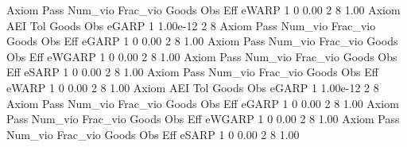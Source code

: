        Axiom {\VBAR} Pass     Num_vio    Frac_vio       Goods         Obs         Eff  
       eWARP {\VBAR}    1           0        0.00           2           8        1.00  
{\smallskip}
       Axiom {\VBAR}       AEI        Tol      Goods        Obs 
       eGARP {\VBAR}         1   1.00e-12          2          8 
{\smallskip}
{\smallskip}
{\smallskip}
       Axiom {\VBAR} Pass     Num_vio    Frac_vio       Goods         Obs         Eff  
       eGARP {\VBAR}    1           0        0.00           2           8        1.00  
{\smallskip}
{\smallskip}
{\smallskip}
       Axiom {\VBAR} Pass     Num_vio    Frac_vio       Goods         Obs         Eff  
      eWGARP {\VBAR}    1           0        0.00           2           8        1.00  
{\smallskip}
{\smallskip}
{\smallskip}
       Axiom {\VBAR} Pass     Num_vio    Frac_vio       Goods         Obs         Eff  
       eSARP {\VBAR}    1           0        0.00           2           8        1.00  
{\smallskip}
{\smallskip}
{\smallskip}
       Axiom {\VBAR} Pass     Num_vio    Frac_vio       Goods         Obs         Eff  
       eWARP {\VBAR}    1           0        0.00           2           8        1.00  
{\smallskip}
       Axiom {\VBAR}       AEI        Tol      Goods        Obs 
       eGARP {\VBAR}         1   1.00e-12          2          8 
{\smallskip}
{\smallskip}
{\smallskip}
       Axiom {\VBAR} Pass     Num_vio    Frac_vio       Goods         Obs         Eff  
       eGARP {\VBAR}    1           0        0.00           2           8        1.00  
{\smallskip}
{\smallskip}
{\smallskip}
       Axiom {\VBAR} Pass     Num_vio    Frac_vio       Goods         Obs         Eff  
      eWGARP {\VBAR}    1           0        0.00           2           8        1.00  
{\smallskip}
{\smallskip}
{\smallskip}
       Axiom {\VBAR} Pass     Num_vio    Frac_vio       Goods         Obs         Eff  
       eSARP {\VBAR}    1           0        0.00           2           8        1.00  
